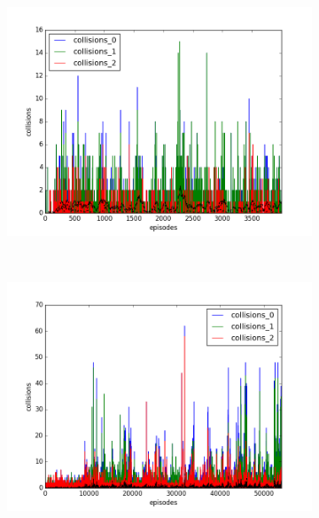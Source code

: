 \begin{figure}[t]
  \vspace{\graphspacing}
  \begin{subfigure}[t]{\figscale\linewidth}
    \hspace*{-2.75cm}
    \includegraphics[width=1.5\textwidth]
    {../results/dqn_2vs1/collisions.png}
    \label{fig:dqn-2vs1-collisions}
  \end{subfigure}
  ~
  \begin{subfigure}[t]{\figscale\linewidth}
    \hspace*{-1.4cm}
    \includegraphics[width=1.5\textwidth]
    {../results/ddpg_2vs1/collisions.png}
    \label{fig:ddpg-2vs1-collisions}
  \end{subfigure}
  ~
  \begin{subfigure}[t]{\figscale\linewidth}

\end{subfigure}
\end{figure}
